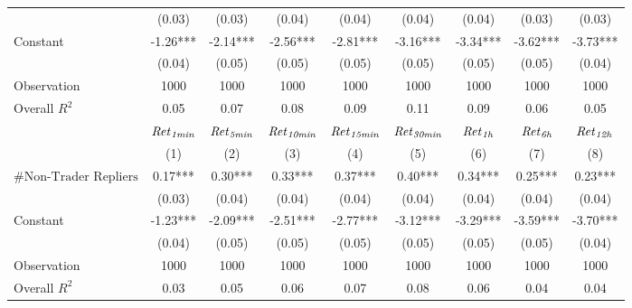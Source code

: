 \begin{tabular}{lcccccccc}
 & (0.03) & (0.03) & (0.04) & (0.04) & (0.04) & (0.04) & (0.03) & (0.03) \\
Constant & -1.26*** & -2.14*** & -2.56*** & -2.81*** & -3.16*** & -3.34*** & -3.62*** & -3.73*** \\
 & (0.04) & (0.05) & (0.05) & (0.05) & (0.05) & (0.05) & (0.05) & (0.04) \\
Observation & 1000 & 1000 & 1000 & 1000 & 1000 & 1000 & 1000 & 1000 \\
Overall $R^2$ & 0.05 & 0.07 & 0.08 & 0.09 & 0.11 & 0.09 & 0.06 & 0.05 \\
\hline
 & ${\it Ret}_{\it 1min}$ & ${\it Ret}_{\it 5min}$ & ${\it Ret}_{\it 10min}$ & ${\it Ret}_{\it 15min}$ & ${\it Ret}_{\it 30min}$ & ${\it Ret}_{\it 1h}$ & ${\it Ret}_{\it 6h}$ & ${\it Ret}_{\it 12h}$ \\
 & (1) & (2) & (3) & (4) & (5) & (6) & (7) & (8) \\
\hline
$\#\text{Non-Trader Repliers}$ & 0.17*** & 0.30*** & 0.33*** & 0.37*** & 0.40*** & 0.34*** & 0.25*** & 0.23*** \\
 & (0.03) & (0.04) & (0.04) & (0.04) & (0.04) & (0.04) & (0.04) & (0.04) \\
Constant & -1.23*** & -2.09*** & -2.51*** & -2.77*** & -3.12*** & -3.29*** & -3.59*** & -3.70*** \\
 & (0.04) & (0.05) & (0.05) & (0.05) & (0.05) & (0.05) & (0.05) & (0.04) \\
Observation & 1000 & 1000 & 1000 & 1000 & 1000 & 1000 & 1000 & 1000 \\
Overall $R^2$ & 0.03 & 0.05 & 0.06 & 0.07 & 0.08 & 0.06 & 0.04 & 0.04 \\
\hline
\end{tabular}
